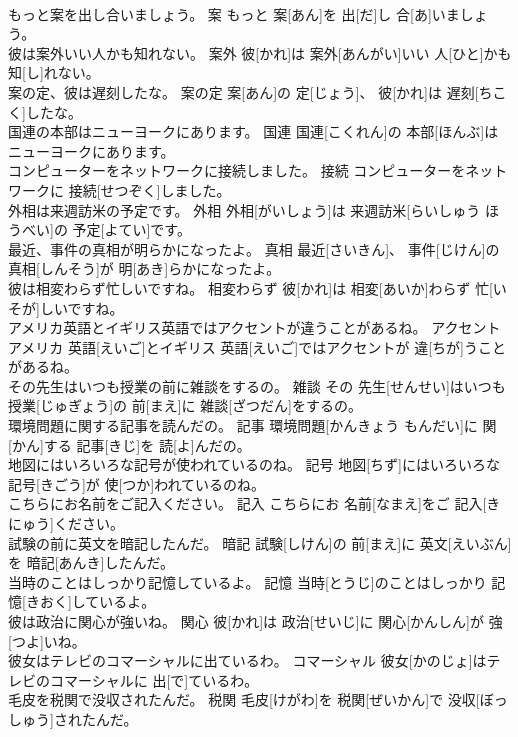 \documentclass[8pt]{extreport}
\begin{document}
\begin{CJK}{UTF8}{min}
\\	もっと案を出し合いましょう。	案	もっと 案[あん]を 出[だ]し 合[あ]いましょう。	
\\	彼は案外いい人かも知れない。	案外	彼[かれ]は 案外[あんがい]いい 人[ひと]かも 知[し]れない。	
\\	案の定、彼は遅刻したな。	案の定	案[あん]の 定[じょう]、 彼[かれ]は 遅刻[ちこく]したな。	
\\	国連の本部はニューヨークにあります。	国連	国連[こくれん]の 本部[ほんぶ]はニューヨークにあります。	
\\	コンピューターをネットワークに接続しました。	接続	コンピューターをネットワークに 接続[せつぞく]しました。	
\\	外相は来週訪米の予定です。	外相	外相[がいしょう]は 来週訪米[らいしゅう ほうべい]の 予定[よてい]です。	
\\	最近、事件の真相が明らかになったよ。	真相	最近[さいきん]、 事件[じけん]の 真相[しんそう]が 明[あき]らかになったよ。	
\\	彼は相変わらず忙しいですね。	相変わらず	彼[かれ]は 相変[あいか]わらず 忙[いそが]しいですね。	
\\	アメリカ英語とイギリス英語ではアクセントが違うことがあるね。	アクセント	アメリカ 英語[えいご]とイギリス 英語[えいご]ではアクセントが 違[ちが]うことがあるね。	
\\	その先生はいつも授業の前に雑談をするの。	雑談	その 先生[せんせい]はいつも 授業[じゅぎょう]の 前[まえ]に 雑談[ざつだん]をするの。	
\\	環境問題に関する記事を読んだの。	記事	環境問題[かんきょう もんだい]に 関[かん]する 記事[きじ]を 読[よ]んだの。	
\\	地図にはいろいろな記号が使われているのね。	記号	地図[ちず]にはいろいろな 記号[きごう]が 使[つか]われているのね。	
\\	こちらにお名前をご記入ください。	記入	こちらにお 名前[なまえ]をご 記入[きにゅう]ください。	
\\	試験の前に英文を暗記したんだ。	暗記	試験[しけん]の 前[まえ]に 英文[えいぶん]を 暗記[あんき]したんだ。	
\\	当時のことはしっかり記憶しているよ。	記憶	当時[とうじ]のことはしっかり 記憶[きおく]しているよ。	
\\	彼は政治に関心が強いね。	関心	彼[かれ]は 政治[せいじ]に 関心[かんしん]が 強[つよ]いね。	
\\	彼女はテレビのコマーシャルに出ているわ。	コマーシャル	彼女[かのじょ]はテレビのコマーシャルに 出[で]ているわ。	
\\	毛皮を税関で没収されたんだ。	税関	毛皮[けがわ]を 税関[ぜいかん]で 没収[ぼっしゅう]されたんだ。	

\end{CJK}
\end{document}
